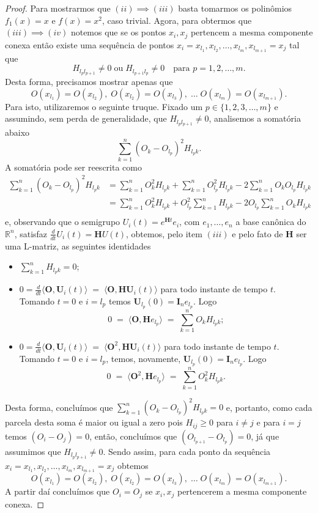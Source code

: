 \documentclass[twoside,openright,titlepage,numbers=noenddot,headinclude,  lineheaders footinclude=true,cleardoublepage=empty,
                                BCOR=5mm,paper=a4,fontsize=12pt ]{scrbook}
\theoremstyle{definition}
\begin{document}
\begin{proof}
Para mostrarmos que $(ii) \implies (iii)$ basta tomarmos os
polinômios $f_1(x) = x$ e $f(x) = x^2$, caso trivial. Agora,
para obtermos que $(iii) \implies (iv)$ notemos que se os
pontos $x_i, x_j$ pertencem a mesma componente conexa então 
existe 
uma sequência de pontos $x_i = x_{l_1}, x_{l_2}, \ldots, x_{l_m}, 
x_{l_{m+1}} = x_j$
tal que 
\[
H_{l_pl_{p+1}} \neq 0 \; \text{ou} \; H_{l_{p+1}l_p} \neq 0
\quad \text{para } p = 1, 2, \ldots, m.
\]
Desta forma, precisamos mostrar apenas que 
\[
O(x_{l_1}) = O(x_{l_2}), \; 
O(x_{l_2}) = O(x_{l_3}), \; \ldots \;
O(x_{l_m}) = O(x_{l_{m+1}}).
\]
Para isto, utilizaremos o seguinte truque. Fixado um $p \in \{
1, 2, 3, \ldots, m\}$ e assumindo, sem perda de generalidade,
que $H_{l_pl_{p+1}} \neq 0$, 
 analisemos a somatória abaixo
\[
\sum_{k=1}^n (O_k - O_{l_p})^2 H_{l_pk}.
\]
A somatória pode ser reescrita como
\begin{align*}
\sum_{k=1}^n (O_k - O_{l_p})^2 H_{l_pk} & =
\sum_{k=1}^n O_k^2 H_{l_pk} +
\sum_{k=1}^n O_{l_p}^2 H_{l_pk} -
2\sum_{k=1}^n O_k O_{l_p} H_{l_pk}\\
&=
\sum_{k=1}^n O_k^2 H_{l_pk} +
 O_{l_p}^2 \sum_{k=1}^n  H_{l_pk} -
 2O_{l_p} \sum_{k=1}^n O_k H_{l_pk}\\
\end{align*}
e, observando que o semigrupo $U_i(t) = e^{\bm{H}t}e_i$,
com $e_1, \ldots, e_n$ a base canônica do $\mathbb{R}^n$, satisfaz 
$\frac{d}{dt} U_i(t) = \bm{H}U(t)$, obtemos, pelo item $(iii)$ e pelo
fato de $\bm{H}$ ser uma L-matriz, as seguintes identidades
\begin{itemize}
\item 
$\sum_{k=1}^n H_{l_pk} = 0$;
\item 
$0 = \frac{d}{dt} \langle \bm{O}, \bm{U}_i(t) \rangle \; = \;
\langle \bm{O}, \bm{HU}_i(t) \rangle  $ para todo instante de tempo $t$. Tomando $t=0$
e $i = l_p$
temos $\bm{U}_{l_p}(0) = \bm{I}_n e_{l_p}$. Logo
\[
0 \;=\; \langle \bm{O}, \bm{H} e_{l_p} \rangle \; = \; 
\sum_{k=1}^n O_k H_{l_pk};
\]
\item 
$0 = \frac{d}{dt} \langle \bm{O}, \bm{U}_i(t) \rangle \; = \;
\langle \bm{O}^2, \bm{HU}_i(t) \rangle  $ para todo instante de tempo $t$. Tomando $t=0$
e $i = l_p$,
temos, novamente, $\bm{U}_{l_p}(0) = \bm{I}_n e_{l_p}$. Logo
\[
0 \;=\; \langle \bm{O}^2, \bm{H} e_{l_p} \rangle \; = \; 
\sum_{k=1}^n O_k^2 H_{l_pk}.
\]
\end{itemize}
Desta forma, concluímos que 
$
\sum_{k=1}^n (O_k - O_{l_p})^2 H_{l_pk} = 0
$
e, portanto, como cada parcela desta soma é maior ou igual a zero pois
$H_{ij} \geq 0$ para $ i \neq j$ e para $i = j$ temos $(O_i -O_j) = 0$,
então, concluímos que $(O_{l_{p+1}} - O_{l_p}) = 0$, já que assumimos
que $H_{l_pl_{p+1}} \neq 0$. Sendo assim, para cada ponto da sequência 
$x_i = x_{l_1}, x_{l_2}, \ldots, x_{l_m}, 
x_{l_{m+1}} = x_j$ obtemos
\[
O(x_{l_1}) = O(x_{l_2}), \; 
O(x_{l_2}) = O(x_{l_3}), \; \ldots \;
O(x_{l_m}) = O(x_{l_{m+1}}).
\]
A partir daí concluímos que $O_i = O_j$ se $x_i, x_j$ pertencerem a mesma
componente conexa.


\end{proof}
\end{document}
